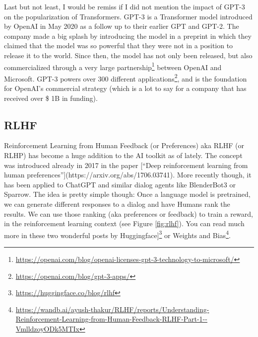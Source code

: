 \documentclass{article}
\begin{document}
Last but not least, I would be remiss if I did not mention the impact of GPT-3\cite{brown2020language} on the popularization of Transformers. GPT-3 is a Transformer model introduced by OpenAI in May 2020 as a follow up to their earlier GPT and GPT-2. The company made a big splash by introducing the model in a preprint\cite{brown2020language} in which they claimed that the model was so powerful that they were not in a position to release it to the world. Since then, the model has not only been released, but also commercialized through a very large partnership\footnote{\url{https://openai.com/blog/openai-licenses-gpt-3-technology-to-microsoft/}} between OpenAI and Microsoft. GPT-3 powers over 300 different applications\footnote{\url{https://openai.com/blog/gpt-3-apps/}}, and is the foundation for OpenAI’s commercial strategy (which is a lot to say for a company that has received over \$ 1B in funding).

\subsection{RLHF}

Reinforcement Learning from Human Feedback (or Preferences) aka RLHF (or RLHP) has become a huge addition to the AI toolkit as of lately. The concept was introduced already in 2017 in the paper [“Deep reinforcement learning from human preferences”](https://arxiv.org/abs/1706.03741). More recently though, it has been applied to ChatGPT and similar dialog agents like BlenderBot3 or Sparrow. The idea is pretty simple though: Once a language model is pretrained, we can generate different responses to a dialog and have Humans rank the results. We can use those ranking (aka preferences or feedback) to train a reward, in the reinforcement learning context (see Figure \ref{fig:rlhf}). You can read much more in these two wonderful posts by Huggingface]\footnote{\url{https://huggingface.co/blog/rlhf}} or Weights and Bias\footnote{\url{https://wandb.ai/ayush-thakur/RLHF/reports/Understanding-Reinforcement-Learning-from-Human-Feedback-RLHF-Part-1--VmlldzoyODk5MTIx}}.
\end{document}
